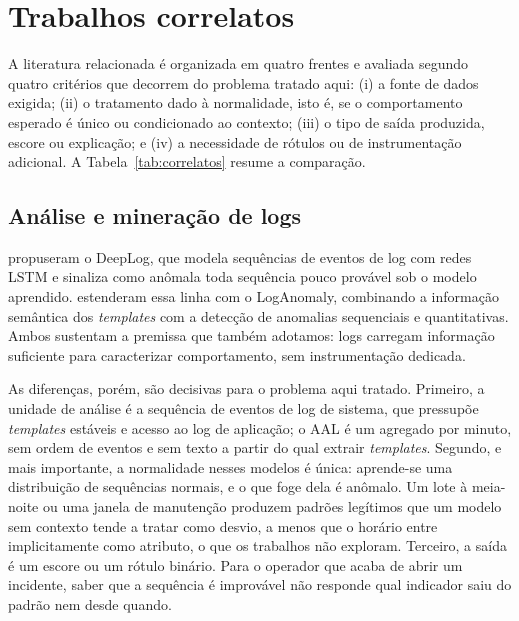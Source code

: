 \documentclass[sigconf,nonacm]{acmart}
\begin{document}
\section{Trabalhos correlatos}\label{sec:correlatos}

A literatura relacionada é organizada em quatro frentes e avaliada segundo quatro critérios que decorrem do problema tratado aqui: (i) a fonte de dados exigida; (ii) o tratamento dado à normalidade, isto é, se o comportamento esperado é único ou condicionado ao contexto; (iii) o tipo de saída produzida, escore ou explicação; e (iv) a necessidade de rótulos ou de instrumentação adicional. A Tabela~\ref{tab:correlatos} resume a comparação.

\subsection{Análise e mineração de logs}
\citet{du2017deeplog} propuseram o DeepLog, que modela sequências de eventos de log com redes LSTM e sinaliza como anômala toda sequência pouco provável sob o modelo aprendido. \citet{meng2019loganomaly} estenderam essa linha com o LogAnomaly, combinando a informação semântica dos \emph{templates} com a detecção de anomalias sequenciais e quantitativas. Ambos sustentam a premissa que também adotamos: logs carregam informação suficiente para caracterizar comportamento, sem instrumentação dedicada.

As diferenças, porém, são decisivas para o problema aqui tratado. Primeiro, a unidade de análise é a sequência de eventos de log de sistema, que pressupõe \emph{templates} estáveis e acesso ao log de aplicação; o AAL é um agregado por minuto, sem ordem de eventos e sem texto a partir do qual extrair \emph{templates}. Segundo, e mais importante, a normalidade nesses modelos é única: aprende-se uma distribuição de sequências normais, e o que foge dela é anômalo. Um lote à meia-noite ou uma janela de manutenção produzem padrões legítimos que um modelo sem contexto tende a tratar como desvio, a menos que o horário entre implicitamente como atributo, o que os trabalhos não exploram. Terceiro, a saída é um escore ou um rótulo binário. Para o operador que acaba de abrir um incidente, saber que a sequência é improvável não responde qual indicador saiu do padrão nem desde quando.
\end{document}
